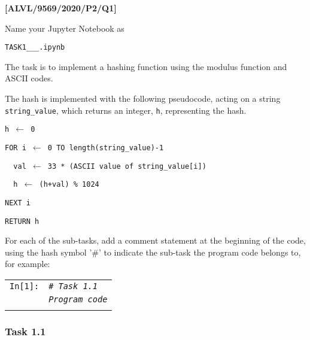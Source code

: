 \begin{onehalfspace}
\item \textbf{{[}ALVL/9569/2020/P2/Q1{]} }
\end{onehalfspace}

\begin{onehalfspace}
\noindent Name your Jupyter Notebook as 

\noindent \texttt{TASK1\_<your name>\_<centre number>\_<index number>.ipynb}

\noindent The task is to implement a hashing function using the modulus
function and ASCII codes.

\noindent The hash is implemented with the following pseudocode, acting
on a string \texttt{string\_value}, which returns an integer, \texttt{h},
representing the hash.

\noindent \texttt{h $\leftarrow$ 0}

\noindent \texttt{FOR i $\leftarrow$ 0 TO length(string\_value)-1}

\noindent \texttt{\quad{}~~val $\leftarrow$ 33 {*} (ASCII value
of string\_value{[}i{]})}

\noindent \texttt{\quad{}~~h $\leftarrow$ (h+val) \% 1024}

\noindent \texttt{NEXT i}

\noindent \texttt{RETURN h}

\noindent For each of the sub-tasks, add a comment statement at the
beginning of the code, using the hash symbol '\#' to indicate the
sub-task the program code belongs to, for example:

\noindent %
\begin{tabular}{l|>{\raggedright}p{}|}
\cline{2-2} 
\texttt{In{[}1{]}:} & \texttt{\emph{\# Task 1.1}}\tabularnewline
 & \texttt{\emph{Program code}}\tabularnewline
\cline{2-2} 
\multicolumn{1}{l}{} & \multicolumn{1}{>{\raggedright}p{0.77\textwidth}}{\texttt{Output :}}\tabularnewline
\end{tabular}
\end{onehalfspace}
\begin{onehalfspace}

\subsubsection*{Task 1.1}
\end{onehalfspace}

